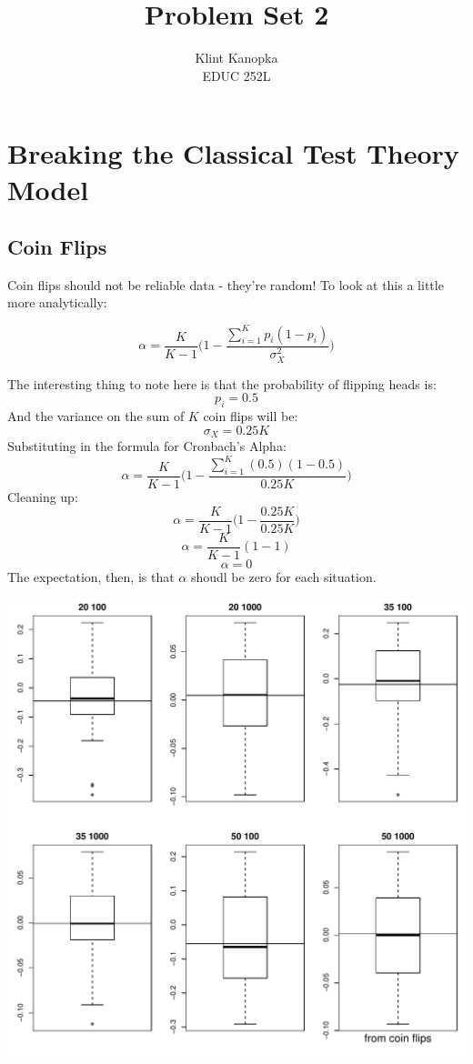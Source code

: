 \documentclass{article}\usepackage[]{graphicx}\usepackage[]{color}
\title{Problem Set 2}
\author{Klint Kanopka \\ EDUC 252L}
\makeatletter
\def\maxwidth{ %
  \ifdim\Gin@nat@width>\linewidth
    \linewidth
  \else
    \Gin@nat@width
  \fi
}
\newenvironment{knitrout}{}{} %
\makeatother
\begin{document}
\maketitle
\section{Breaking the Classical Test Theory Model}

  \subsection{Coin Flips}
    Coin flips should not be reliable data - they're random!  To look at this a little more analytically:
    
      \[ \alpha = \frac{K}{K-1}\Bigg(1-\frac{\sum_{i=1}^{K}p_i(1-p_i)}{\sigma_{X}^{2}}\Bigg)\]
    
    The interesting thing to note here is that the probability of flipping heads is:
      \[p_i = 0.5 \]
    And the variance on the sum of $K$ coin flips will be:
      \[ \sigma_X = 0.25K \]
    Substituting in the formula for Cronbach's Alpha:
      \[ \alpha = \frac{K}{K-1}\Bigg(1-\frac{\sum_{i=1}^{K}(0.5)(1-0.5)}{0.25K}\Bigg)\]
    Cleaning up:
      \[ \alpha = \frac{K}{K-1}\Bigg(1-\frac{0.25K}{0.25K}\Bigg)\]
      \[ \alpha = \frac{K}{K-1}(1-1)\]
      \[ \alpha = 0 \]
    The expectation, then, is that $\alpha$ shoudl be zero for each situation.


\begin{knitrout}
\color{fgcolor}
\includegraphics[width=\maxwidth]{figure/unnamed-chunk-1-1} 

\end{knitrout}
\end{document}
